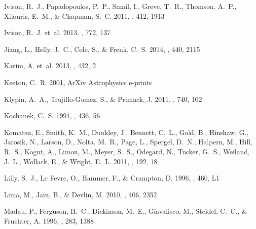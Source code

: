 \documentclass[iop]{emulateapj}
\begin{document}
\begin{thebibliography}{106}
{Ivison}, R.~J., {Papadopoulos}, P.~P., {Smail}, I., {Greve}, T.~R., {Thomson},
  A.~P., {Xilouris}, E.~M., \& {Chapman}, S.~C. 2011, \mnras, 412, 1913

{Ivison}, R.~J. {et~al.} 2013, \apj, 772, 137

{Jiang}, L., {Helly}, J.~C., {Cole}, S., \& {Frenk}, C.~S. 2014, \mnras, 440,
  2115

{Karim}, A. {et~al.} 2013, \mnras, 432, 2

{Keeton}, C.~R. 2001, ArXiv Astrophysics e-prints

{Klypin}, A.~A., {Trujillo-Gomez}, S., \& {Primack}, J. 2011, \apj, 740, 102

{Kochanek}, C.~S. 1994, \apj, 436, 56

{Komatsu}, E., {Smith}, K.~M., {Dunkley}, J., {Bennett}, C.~L., {Gold}, B.,
  {Hinshaw}, G., {Jarosik}, N., {Larson}, D., {Nolta}, M.~R., {Page}, L.,
  {Spergel}, D.~N., {Halpern}, M., {Hill}, R.~S., {Kogut}, A., {Limon}, M.,
  {Meyer}, S.~S., {Odegard}, N., {Tucker}, G.~S., {Weiland}, J.~L., {Wollack},
  E., \& {Wright}, E.~L. 2011, \apjs, 192, 18

{Lilly}, S.~J., {Le Fevre}, O., {Hammer}, F., \& {Crampton}, D. 1996, \apjl,
  460, L1

{Lima}, M., {Jain}, B., \& {Devlin}, M. 2010, \mnras, 406, 2352

{Madau}, P., {Ferguson}, H.~C., {Dickinson}, M.~E., {Giavalisco}, M.,
  {Steidel}, C.~C., \& {Fruchter}, A. 1996, \mnras, 283, 1388


\end{thebibliography}
\end{document}
